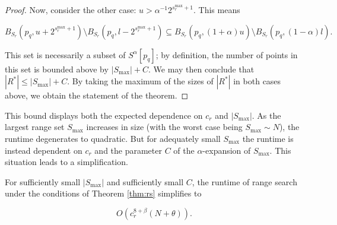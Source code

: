\begin{proof}
Now, consider the other case: $u > \alpha^{-1} 2^{s_r^{\max} + 1}$.
This means

\begin{equation}
B_{S_r}(p_q, u + 2^{s_r^{\max} + 1}) \setminus B_{S_r}(p_q, l - 2^{s_r^{\max} +
1}) \subseteq B_{S_r}(p_q, (1 + \alpha) u) \setminus B_{S_r}(p_q, (1 - \alpha)
l).
\end{equation}

This set is necessarily a subset of $S^{\alpha}[p_q]$; by
definition, the number of points in this set is bounded above by $|S_{\max}| +
C$.  We may then conclude that $|R^*| \le |S_{\max}| + C$.  By taking the
maximum of the sizes of $|R^*|$ in both cases above, we obtain the statement of
the theorem.
\end{proof}

This bound displays both the expected dependence on $c_r$ and $|S_{\max}|$.  As
the largest range set $S_{\max}$ increases in size (with the worst case being
$S_{\max} \sim N$), the runtime degenerates to quadratic.  But for adequately
small $S_{\max}$ the runtime is instead dependent on $c_r$ and the parameter $C$
of the $\alpha$-expansion of $S_{\max}$.  This situation leads to a
simplification.

\begin{cor}
For sufficiently small $|S_{\max}|$ and sufficiently small $C$, the runtime of
range search under the conditions of Theorem \ref{thm:rs} simplifies to

\begin{equation}
O(c_r^{8 + \beta} (N + \theta)).
\end{equation}
\label{cor:rs}
\end{cor}

%


